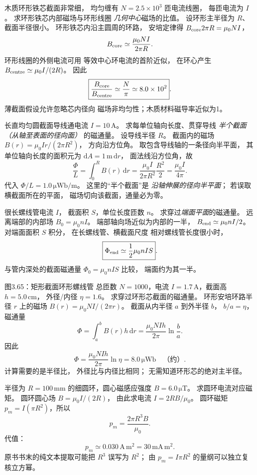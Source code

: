 木质环形铁芯截面非常细，
均匀缠有 $N=2.5\times10^3$ 匝电流线圈，
每匝电流为 $I$。
求环形铁芯内部磁场与环形线圈
\emph{几何中心}磁场的比值。
\exsolution
设环形主半径为 $R$、截面半径很小。
环形铁芯内沿主圆周的环路，
安培定律得
$B_{\rm core}2\pi R=\mu_0NI$，
\[
B_{\rm core}\simeq\frac{\mu_0NI}{2\pi R}.
\]
环形线圈的外侧电流可用
等效中心环电流的首阶近似，
在环心产生
$B_{\rm centre}\simeq\mu_0I/(2R)$。
因此
\[
\boxed{\frac{B_{\rm core}}{B_{\rm centre}}
\simeq\frac N\pi
\simeq8.0\times10^2}.
\]
\excheck 薄截面假设允许忽略芯内径向
磁场非均匀性；木质材料磁导率近似为1。

长直均匀圆截面导线通电流
$I=10\,\mathrm A$。
求每单位轴向长度、贯穿导线
\emph{半个截面（从轴至表面的径向面）}
的磁通量。
\exsolution
设导线半径 $R$。
截面内的磁场
$B(r)=\mu_0Ir/(2\pi R^2)$，
方向沿方位角。
取包含导线轴的一条径向半平面，
其单位轴向长度的面积元为
$\mathrm dA=1\,\mathrm m\,\mathrm dr$，
面法线沿方位角，故
\[
\frac{\Phi}{L}=
\int_0^RB(r)\,\mathrm dr
=\frac{\mu_0I}{2\pi R^2}\frac{R^2}{2}
=\boxed{\frac{\mu_0I}{4\pi}}.
\]
代入
$\boxed{\Phi/L=1.0\,\mathrm{\mu Wb/m}}$。
\excheck 这里的“半个截面”是
\emph{沿轴伸展的径向半平面}；
若误取横截面所在的平面，
磁场切向该截面，通量必为零。

很长螺线管电流 $I$，
截面积 $S$，单位长度匝数 $n$。
求穿过\emph{端面平面}的磁通量。
\exsolution
远离端部的内部场
$B_0=\mu_0nI$。
端部轴向场近似为内部的一半，
$B_{\rm end}\simeq\mu_0nI/2$。
对端面面积 $S$ 积分，
在长螺线管、横截面尺度
相对螺线管长度很小时，
\[
\boxed{\Phi_{\rm end}\simeq
\frac12\mu_0nIS}.
\]
\excheck 与管内深处的截面磁通量
$\Phi_0=\mu_0nIS$ 比较，
端面约为其一半。

图3.65：矩形截面环形螺线管
总匝数 $N=1000$，电流
$I=1.7\,\mathrm A$，截面高
$h=5.0\,\mathrm{cm}$，
外径/内径 $\eta=1.6$。
求穿过环形芯截面的磁通量。
\exsolution
环形安培环路半径 $r$
上的磁场
$B(r)=\mu_0NI/(2\pi r)$。
截面从内半径 $a$ 到外半径 $b$，
$b/a=\eta$，
磁通量
\[
\Phi=\int_a^bB(r)h\,\mathrm dr
=\frac{\mu_0NIh}{2\pi}\ln\frac ba.
\]
因此
\[
\boxed{\Phi=
\frac{\mu_0NIh}{2\pi}\ln\eta}
=\boxed{8.0\,\mathrm{\mu Wb}}\quad\text{（约）}.
\]
\excheck 计算需要的是半径比，
外径比与内径比相同；
无需知道环形芯的绝对主半径。

半径为 $R=100\,\mathrm{mm}$
的细圆环，圆心磁感应强度
$B=6.0\,\mathrm{\mu T}$。
求圆环电流对应磁矩。
\exsolution
圆环圆心场
$B=\mu_0I/(2R)$，
由此求电流
$I=2RB/\mu_0$。
圆环磁矩
$p_m=I(\pi R^2)$，所以
\[
\boxed{p_m=\frac{2\pi R^3B}{\mu_0}}.
\]
代值：
\[
\boxed{p_m\simeq0.030\,\mathrm{A\,m^2}
=30\,\mathrm{mA\,m^2}}.
\]
\excheck 原书书末的纯文本提取可能把
$R^3$ 误写为 $R^2$；
由 $p_m=I\pi R^2$ 的量纲可以独立复核立方幂。

